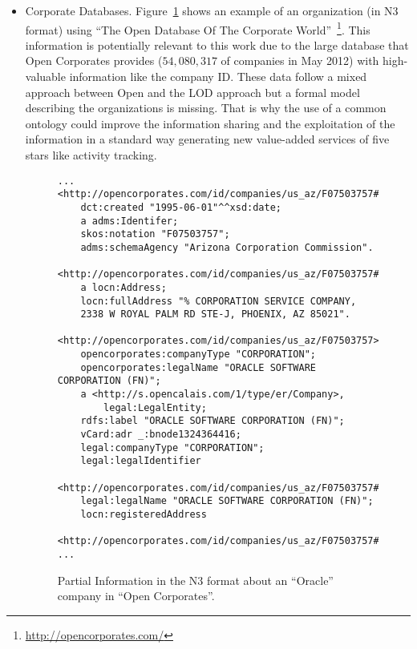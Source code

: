 \documentclass{llncs}
\begin{document}
\begin{itemize}
 
 \item Corporate Databases. Figure~\ref{figure:open} shows an example of an organization (in N3 format) using ``The Open Database Of The Corporate World''~\footnote{\url{http://opencorporates.com/}}. 
 This information is potentially relevant to this work due to the large database that Open Corporates provides ($54,080,317$ of companies in May 2012) 
 with high-valuable information like the company ID. These data follow a mixed approach between Open and the LOD approach but a formal 
 model describing the organizations is missing. That is why the use of a common ontology could improve the information sharing and 
 the exploitation of the information in a standard way generating new value-added services of five stars like activity tracking. 

\begin{figure}[!h]
\begin{center}
\begin{lstlisting}[language=SPARQL]
...
<http://opencorporates.com/id/companies/us_az/F07503757#id> 
	dct:created "1995-06-01"^^xsd:date;
	a adms:Identifer;
	skos:notation "F07503757";
	adms:schemaAgency "Arizona Corporation Commission".

<http://opencorporates.com/id/companies/us_az/F07503757#ra> 
	a locn:Address;
	locn:fullAddress "% CORPORATION SERVICE COMPANY, 
	2338 W ROYAL PALM RD STE-J, PHOENIX, AZ 85021".

<http://opencorporates.com/id/companies/us_az/F07503757> 
	opencorporates:companyType "CORPORATION";
	opencorporates:legalName "ORACLE SOFTWARE CORPORATION (FN)";
	a <http://s.opencalais.com/1/type/er/Company>,
		legal:LegalEntity;
	rdfs:label "ORACLE SOFTWARE CORPORATION (FN)";
	vCard:adr _:bnode1324364416;
	legal:companyType "CORPORATION";
	legal:legalIdentifier 
	  <http://opencorporates.com/id/companies/us_az/F07503757#id>;
	legal:legalName "ORACLE SOFTWARE CORPORATION (FN)";
	locn:registeredAddress 
	  <http://opencorporates.com/id/companies/us_az/F07503757#ra>.
...
\end{lstlisting}
\caption{Partial Information in the N3 format about an ``Oracle'' company in ``Open Corporates''.}
\label{figure:open}
\end{center}
\end{figure}
 
 
\end{itemize}
\end{document}
